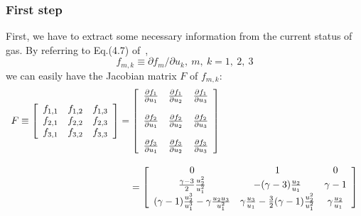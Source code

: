 \documentclass[a4paper,12pt,dvips]{article}
\begin{document}
\subsubsection{First step}
 \label{subsubsec:first_step}
First, we have to extract some necessary information from the current status
of gas. By referring to Eq.(4.7) of~\cite{CESE_Shin_Chung_Chang_1995},
\begin{equation}
f_{m,k}\equiv\partial f_{m}/\partial u_{k},~m,~k = 1,~2,~3
\end{equation}
we can easily have the Jacobian matrix $F$ of $f_{m,k}$:
\begin{equation}
\begin{array}{l}
F\equiv\left[
       \begin{array}{ccc}
       f_{1,1} & f_{1,2} & f_{1,3} \\
       f_{2,1} & f_{2,2} & f_{2,3} \\
       f_{3,1} & f_{3,2} & f_{3,3}
       \end{array}
       \right]
       =
       \left[
       \begin{array}{ccc}
       \frac{\partial f_{1}}{\partial u_{1}} & \frac{\partial f_{1}}{\partial
       u_{2}} & \frac{\partial f_{1}}{\partial u_{3}} \\ \\
       \frac{\partial f_{2}}{\partial u_{1}} & \frac{\partial f_{2}}{\partial
       u_{2}} & \frac{\partial f_{2}}{\partial u_{3}} \\ \\
       \frac{\partial f_{3}}{\partial u_{1}} & \frac{\partial f_{3}}{\partial
       u_{2}} & \frac{\partial f_{3}}{\partial u_{3}}
       \end{array}
       \right] \\ \\
       \hspace{44mm}=
       \left[
       \begin{array}{ccc}
       0 & 1 & 0 \\
       \frac{\gamma -3}{2}\frac{u^{2}_{2}}{u^{2}_{1}} & -(\gamma -3)\frac{u_{2}}
       {u_{1}} & \gamma -1 \\
       (\gamma -1)\frac{u^{3}_{2}}{u^{3}_{1}}-\gamma\frac{u_{2}u_{3}}{u^{2}_{1}}
       & \gamma\frac{u_{3}}{u_{1}}-\frac{3}{2}(\gamma -1)\frac{u^{2}_{2}}{u^{2}_{1}}
       & \gamma\frac{u_{2}}{u_{1}}
       \end{array}
       \right]
\end{array}
\end{equation}
\end{document}

